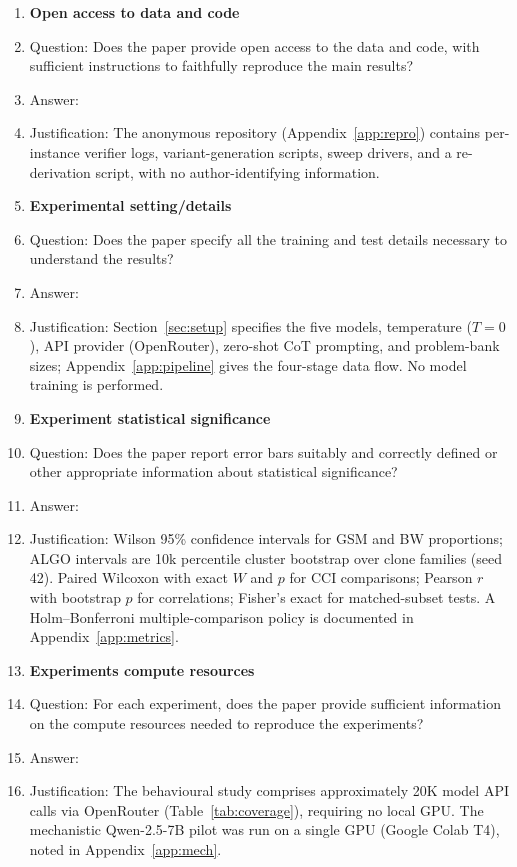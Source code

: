 \begin{enumerate}
\item {\bf Open access to data and code}
    \item[] Question: Does the paper provide open access to the data and code,
    with sufficient instructions to faithfully reproduce the main results?
    \item[] Answer: \answerYes{}
    \item[] Justification: The anonymous repository (Appendix~\ref{app:repro})
    contains per-instance verifier logs, variant-generation scripts, sweep
    drivers, and a re-derivation script, with no author-identifying
    information.

\item {\bf Experimental setting/details}
    \item[] Question: Does the paper specify all the training and test details
    necessary to understand the results?
    \item[] Answer: \answerYes{}
    \item[] Justification: Section~\ref{sec:setup} specifies the five models,
    temperature ($T{=}0$), API provider (OpenRouter), zero-shot CoT prompting,
    and problem-bank sizes; Appendix~\ref{app:pipeline} gives the four-stage
    data flow. No model training is performed.

\item {\bf Experiment statistical significance}
    \item[] Question: Does the paper report error bars suitably and correctly
    defined or other appropriate information about statistical significance?
    \item[] Answer: \answerYes{}
    \item[] Justification: Wilson 95\% confidence intervals for GSM and BW
    proportions; ALGO intervals are 10k percentile cluster bootstrap over
    clone families (seed 42). Paired Wilcoxon with exact $W$ and $p$ for CCI comparisons;
    Pearson $r$ with bootstrap $p$ for correlations; Fisher's exact for
    matched-subset tests. A Holm--Bonferroni multiple-comparison policy is
    documented in Appendix~\ref{app:metrics}.

\item {\bf Experiments compute resources}
    \item[] Question: For each experiment, does the paper provide sufficient
    information on the compute resources needed to reproduce the experiments?
    \item[] Answer: \answerYes{}
    \item[] Justification: The behavioural study comprises approximately 20K
    model API calls via OpenRouter (Table~\ref{tab:coverage}), requiring no
    local GPU. The mechanistic Qwen-2.5-7B pilot was run on a single GPU
    (Google Colab T4), noted in Appendix~\ref{app:mech}.


\end{enumerate}
